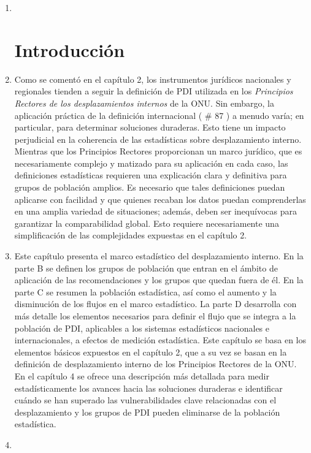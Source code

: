 \documentclass[
]{book}
\begin{document}
\begin{enumerate}
\def\labelenumi{\arabic{enumi}.}
\item ~
  \hypertarget{introducciuxf3n-1}{%
  \section{Introducción}\label{introducciuxf3n-1}}
\item
  Como se comentó en el capítulo 2, los instrumentos jurídicos nacionales y regionales tienden a seguir la definición de PDI utilizada en los \emph{Principios Rectores de los desplazamientos internos} de la ONU. Sin embargo, la aplicación práctica de la definición internacional (
  \# 87
  ) a menudo varía; en particular, para determinar soluciones duraderas. Esto tiene un impacto perjudicial en la coherencia de las estadísticas sobre desplazamiento interno. Mientras que los Principios Rectores proporcionan un marco jurídico, que es necesariamente complejo y matizado para su aplicación en cada caso, las definiciones estadísticas requieren una explicación clara y definitiva para grupos de población amplios. Es necesario que tales definiciones puedan aplicarse con facilidad y que quienes recaban los datos puedan comprenderlas en una amplia variedad de situaciones; además, deben ser inequívocas para garantizar la comparabilidad global. Esto requiere necesariamente una simplificación de las complejidades expuestas en el capítulo 2.
\item
  Este capítulo presenta el marco estadístico del desplazamiento interno. En la parte B se definen los grupos de población que entran en el ámbito de aplicación de las recomendaciones y los grupos que quedan fuera de él. En la parte C se resumen la población estadística, así como el aumento y la disminución de los flujos en el marco estadístico. La parte D desarrolla con más detalle los elementos necesarios para definir el flujo que se integra a la población de PDI, aplicables a los sistemas estadísticos nacionales e internacionales, a efectos de medición estadística. Este capítulo se basa en los elementos básicos expuestos en el capítulo 2, que a su vez se basan en la definición de desplazamiento interno de los Principios Rectores de la ONU. En el capítulo 4 se ofrece una descripción más detallada para medir estadísticamente los avances hacia las soluciones duraderas e identificar cuándo se han superado las vulnerabilidades clave relacionadas con el desplazamiento y los grupos de PDI pueden eliminarse de la población estadística.
\item ~
  \hypertarget{marco-estaduxedstico-del-desplazamiento-interno}{%
}
\end{enumerate}
\end{document}
